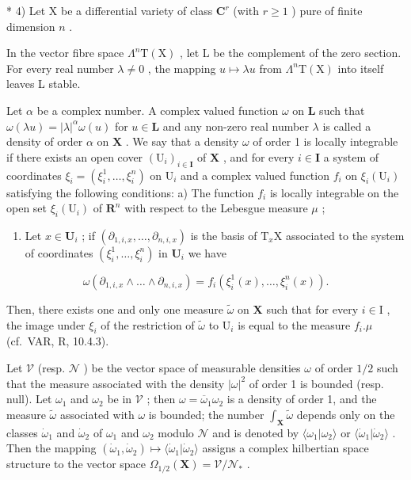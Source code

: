 * 4) Let X be a differential variety of class \(\mathbf{C}^r\) (with \(r \geqslant 1\) ) pure of finite dimension \(n\) .

In the vector fibre space \(\Lambda^{n}\mathrm{T}(\mathrm{X})\) , let L be the complement of the zero section. For every real number \(\lambda \neq 0\) , the mapping \(u \mapsto \lambda u\) from \(\Lambda^{n}\mathrm{T}(\mathrm{X})\) into itself leaves L stable.

Let \(\alpha\) be a complex number. A complex valued function \(\omega\) on \(\mathbf{L}\) such that \(\omega (\lambda u) = |\lambda |^{\alpha}\omega (u)\) for \(u\in \mathbf{L}\) and any non-zero real number \(\lambda\) is called a density of order \(\alpha\) on \(\mathbf{X}\) . We say that a density \(\omega\) of order 1 is locally integrable if there exists an open cover \((\mathrm{U}_i)_{i\in \mathbf{I}}\) of \(\mathbf{X}\) , and for every \(i\in \mathbf{I}\) a system of coordinates \(\xi_i = (\xi_i^1,\dots,\xi_i^n)\) on \(\mathrm{U}_i\) and a complex valued function \(f_{i}\) on \(\xi_i(\mathrm{U}_i)\) satisfying the following conditions: a) The function \(f_{i}\) is locally integrable on the open set \(\xi_i(\mathrm{U}_i)\) of \(\mathbf{R}^n\) with respect to the Lebesgue measure \(\mu\) ;

\begin{enumerate}
\def\labelenumi{\alph{enumi})}
\setcounter{enumi}{1}
\tightlist
\item
  Let \(x \in \mathbf{U}_i\) ; if \((\partial_{1,i,x}, \ldots, \partial_{n,i,x})\) is the basis of \(\mathrm{T}_x\mathrm{X}\) associated to the system of coordinates \((\xi_i^1, \ldots, \xi_i^n)\) in \(\mathbf{U}_i\) we have
\end{enumerate}

\[
\omega \left(\partial_ {1, i, x} \wedge \dots \wedge \partial_ {n, i, x}\right) = f _ {i} \left(\xi_ {i} ^ {1} (x), \dots , \xi_ {i} ^ {n} (x)\right).
\]

Then, there exists one and only one measure \(\tilde{\omega}\) on \(\mathbf{X}\) such that for every \(i\in \mathrm{I}\) , the image under \(\xi_{i}\) of the restriction of \(\tilde{\omega}\) to \(\mathrm{U}_i\) is equal to the measure \(f_{i}.\mu\) (cf.~VAR, R, 10.4.3).

Let \(\mathcal{V}\) (resp. \(\mathcal{N}\) ) be the vector space of measurable densities \(\omega\) of order \(1/2\) such that the measure associated with the density \(|\omega|^2\) of order 1 is bounded (resp. null). Let \(\omega_1\) and \(\omega_2\) be in \(\mathcal{V}\) ; then \(\omega = \overline{\omega}_1\omega_2\) is a density of order 1, and the measure \(\tilde{\omega}\) associated with \(\omega\) is bounded; the number \(\int_{\mathbf{X}}\tilde{\omega}\) depends only on the classes \(\dot{\omega}_1\) and \(\dot{\omega}_2\) of \(\omega_1\) and \(\omega_2\) modulo \(\mathcal{N}\) and is denoted by \(\langle\omega_1|\omega_2\rangle\) or \(\langle\dot{\omega}_1|\dot{\omega}_2\rangle\) . Then the mapping \((\dot{\omega}_1,\dot{\omega}_2)\mapsto\langle\dot{\omega}_1|\dot{\omega}_2\rangle\) assigns a complex hilbertian space structure to the vector space \(\Omega_{1/2}(\mathbf{X})=\mathcal{V}/\mathcal{N}_{*}\) .

